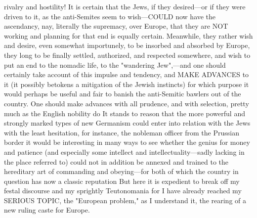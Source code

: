 \documentclass[12pt]{article}
\begin{document}
rivalry and hostility! It is certain that the Jews, if they desired---or if they were driven to it, as the anti-Semites seem to wish---COULD now have the ascendancy, nay, literally the supremacy, over Europe, that they are NOT working and planning for that end is equally certain. Meanwhile, they rather wish and desire, even somewhat importunely, to be insorbed and absorbed by Europe, they long to be finally settled, authorized, and respected somewhere, and wish to put an end to the nomadic life, to the "wandering Jew",---and one should certainly take account of this impulse and tendency, and MAKE ADVANCES to it (it possibly betokens a mitigation of the Jewish instincts) for which purpose it would perhaps be useful and fair to banish the anti-Semitic bawlers out of the country. One should make advances with all prudence, and with selection, pretty much as the English nobility do It stands to reason that the more powerful and strongly marked types of new Germanism could enter into relation with the Jews with the least hesitation, for instance, the nobleman officer from the Prussian border it would be interesting in many ways to see whether the genius for money and patience (and especially some intellect and intellectuality---sadly lacking in the place referred to) could not in addition be annexed and trained to the hereditary art of commanding and obeying---for both of which the country in question has now a classic reputation But here it is expedient to break off my festal discourse and my sprightly Teutonomania for I have already reached my SERIOUS TOPIC, the "European problem," as I understand it, the rearing of a new ruling caste for Europe.
\end{document}
